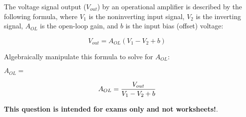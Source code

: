 

The voltage signal output ($V_{out}$) by an operational amplifier is described by the following formula, where $V_1$ is the noninverting input signal, $V_2$ is the inverting signal, $A_{OL}$ is the open-loop gain, and $b$ is the input bias (offset) voltage:

$$V_{out} = A_{OL} (V_1 - V_2 + b)$$

Algebraically manipulate this formula to solve for $A_{OL}$:

\vskip 20pt

$A_{OL} = $







$$A_{OL} = {V_{out} \over {V_1 - V_2 + b}}$$







{\bf This question is intended for exams only and not worksheets!}.



